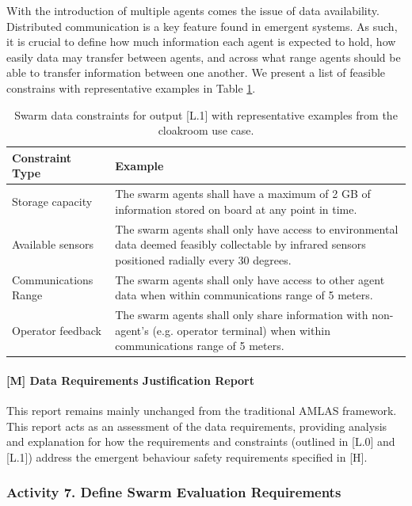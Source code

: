 \documentclass[lettersize,journal]{IEEEtran}
\begin{document}
With the introduction of multiple agents comes the issue of data availability. Distributed communication is a key feature found in emergent systems. As such, it is crucial to define how much information each agent is expected to hold, how easily data may transfer between agents, and across what range agents should be able to transfer information between one another. We present a list of feasible constrains with representative examples in Table \ref{tab:constraints}.

\begin{table}[H]
    \centering
    \begin{tabular}{p{2cm} p{6cm}}
         \textbf{Constraint Type} & \textbf{Example}  \\
         \hline
         Storage capacity & The swarm agents shall have a maximum of 2 GB of information stored on board at any point in time. \\
         \hline
         Available sensors & The swarm agents shall only have access to environmental data deemed feasibly collectable by infrared sensors positioned radially every 30 degrees. \\
         \hline
         Communications Range & The swarm agents shall only have access to other agent data when within communications range of 5 meters. \\
         \hline
         Operator feedback & The swarm agents shall only share information with non-agent’s (e.g. operator terminal) when within communications range of 5 meters.
    \end{tabular}
    \caption{Swarm data constraints for output [L.1] with representative examples from the cloakroom use case.}
    \label{tab:constraints}
\end{table}

\paragraph*{[M] Data Requirements Justification Report}

This report remains mainly unchanged from the traditional AMLAS framework. This report acts as an assessment of the data requirements, providing analysis and explanation for how the requirements and constraints (outlined in [L.0] and [L.1]) address the emergent behaviour safety requirements specified in [H].

\subsubsection*{Activity 7. Define Swarm Evaluation Requirements}
\end{document}
